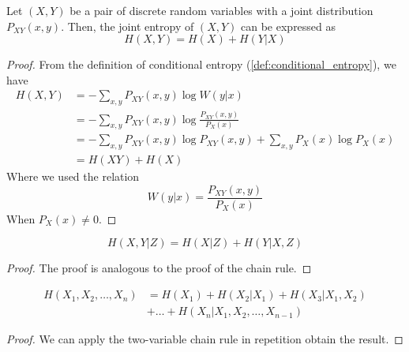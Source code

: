 \begin{theorem}\label{thm:chain_rule}
    Let $(X,Y)$ be a pair of discrete random variables with a joint distribution $P_{XY}(x,y)$. Then, the joint entropy of $(X,Y)$ can be expressed as
    \begin{equation}
        H(X,Y) = H(X) + H(Y|X)
    \end{equation}
\end{theorem}
\begin{proof}
    From the definition of conditional entropy (\ref{def:conditional_entropy}), we have
    \begin{align*}
        H(X,Y) & = -\sum_{x,y} P_{XY}(x,y) \log W(y|x)                                        \\
               & = -\sum_{x,y} P_{XY}(x,y) \log \frac{P_{XY}(x,y)}{P_X(x)}                    \\
               & = -\sum_{x,y} P_{XY}(x,y) \log P_{XY}(x,y) + \sum_{x,y} P_{X}(x) \log P_X(x) \\
               & = H(XY) + H(X)
    \end{align*}
    Where we used the relation
    \begin{equation}
        W(y|x) = \frac{P_{XY}(x,y)}{P_X(x)}
    \end{equation}
    When $P_X(x) \neq 0$.
\end{proof}

\begin{corollary}
    \begin{equation}
        H(X, Y|Z) = H(X|Z) + H(Y|X,Z)
    \end{equation}
\end{corollary}
\begin{proof}
    The proof is analogous to the proof of the chain rule.
\end{proof}

\begin{corollary}
    \begin{align}
        H(X_1, X_2, \ldots, X_n) & = H(X_1) + H(X_2|X_1) + H(X_3|X_1, X_2) \nonumber \\
                                 & + \ldots + H(X_n|X_1, X_2, \ldots, X_{n-1})
    \end{align}
\end{corollary}
\begin{proof}
    We can apply the two-variable chain rule in repetition obtain the result.
\end{proof}

